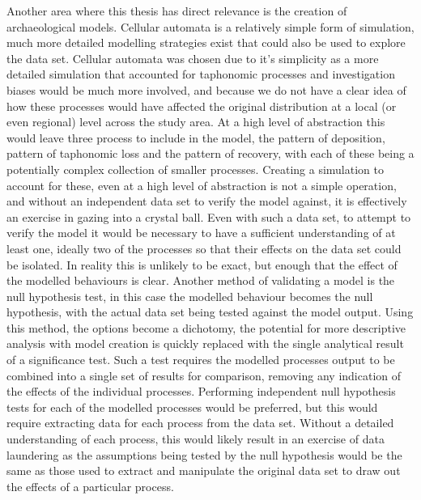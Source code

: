Another area where this thesis has direct relevance is the creation of archaeological models. Cellular automata is a relatively simple form of simulation, much more detailed modelling strategies exist that could also be used to explore the data set. Cellular automata was chosen due to it's simplicity as a more detailed simulation that accounted for taphonomic processes and investigation biases would be much more involved, and because we do not have a clear idea of how these processes would have affected the original distribution at a local (or even regional) level across the study area. At a high level of abstraction this would leave three process to include in the model, the pattern of deposition, pattern of taphonomic loss and the pattern of recovery, with each of these being a potentially complex collection of smaller processes. Creating a simulation to account for these, even at a high level of abstraction is not a simple operation, and without an independent data set to verify the model against, it is effectively an exercise in gazing into a crystal ball. Even with such a data set, to attempt to verify the model it would be necessary to have a sufficient understanding of at least one, ideally two of the processes so that their effects on the data set could be isolated. In reality this is unlikely to be exact, but enough that the effect of the modelled behaviours is clear. Another method of validating a model is the null hypothesis test, in this case the modelled behaviour becomes the null hypothesis, with the actual data set being tested against the model output. Using this method, the options become a dichotomy, the potential for more descriptive analysis with model creation is quickly replaced with the single analytical result of a significance test. Such a test requires the modelled processes output to be combined into a single set of results for comparison, removing any indication of the effects of the individual processes. Performing independent null hypothesis tests for each of the modelled processes would be preferred, but this would require extracting data for each process from the data set. Without a detailed understanding of each process, this would likely result in an exercise of data laundering as the assumptions being tested by the null hypothesis would be the same as those used to extract and manipulate the original data set to draw out the effects of a particular process.

